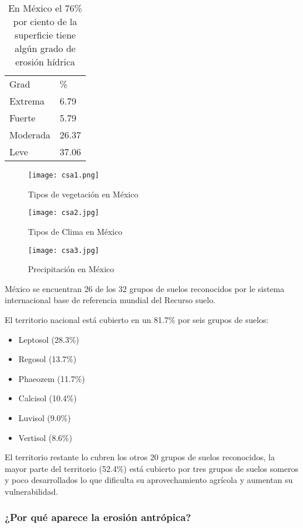 \begin{table}[h!]
    \centering
    \begin{tabular}{@{}ll@{}}
    Grad     & \%    \\
    Extrema  & 6.79  \\
    Fuerte   & 5.79  \\
    Moderada & 26.37 \\
    Leve     & 37.06
    \end{tabular}
    \caption{En México el 76\% por ciento de la superficie tiene algún grado de erosión hídrica}
    \label{tabcsa2}
\end{table}
\begin{figure}[h!]
\centering
  \texttt{[image: csa1.png]}
  \caption{Tipos de vegetación en México}
  \label{csa1}
\end{figure}
\begin{figure}[h!]
\centering
  \texttt{[image: csa2.jpg]}
  \caption{Tipos de Clima en México}
  \label{csa2}
\end{figure}
\begin{figure}[h!]
\centering
  \texttt{[image: csa3.jpg]}
  \caption{Precipitación en México}
  \label{csa3}
\end{figure}

México se encuentran 26 de los 32 grupos de suelos reconocidos por le sistema internacional base de referencia mundial del Recurso suelo.

El territorio nacional está cubierto en un 81.7\% por seis grupos de suelos:
\begin{itemize}
    \item Leptosol (28.3\%)
    \item Regosol (13.7\%)
    \item Phaeozem (11.7\%) %
    \item Calcisol (10.4\%)
    \item Luvisol (9.0\%) %
    \item Vertisol (8.6\%) %
\end{itemize}
El territorio restante lo cubren los otros 20 grupos de suelos reconocidos, la mayor parte del territorio (52.4\%) está cubierto por tres grupos de suelos someros y poco desarrollados lo que dificulta su aprovechamiento agrícola y aumentan su vulnerabilidad.
\subsubsection{¿Por qué aparece la erosión antrópica?}

